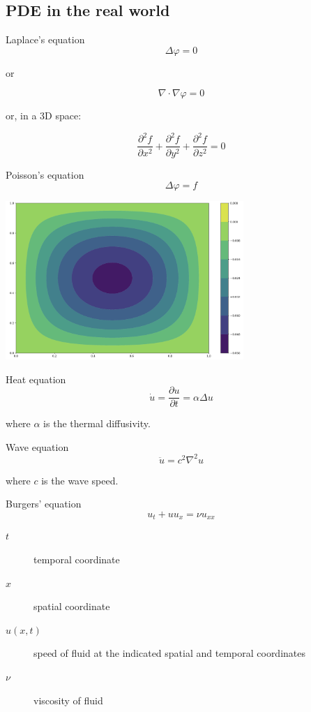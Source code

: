 \documentclass[aspectratio=1610,xcolor={dvipsnames},hyperref={colorlinks,unicode,linkcolor=violet,anchorcolor=BlueViolet,citecolor=YellowOrange,filecolor=black,urlcolor=Aquamarine}]{beamer}
\begin{document}
\subsection{PDE in the real world}
\label{sec:orga8ece5e}

\begin{frame}[label={sec:org391d88d}]{Laplace's equation}
\[\Delta \varphi = 0\]

or

\[\nabla \cdot \nabla \varphi = 0\]

or, in a 3D space:

\[\frac  {\partial ^{2}f}{\partial x^{2}}+\frac  {\partial ^{2}f}{\partial y^{2}}+\frac  {\partial ^{2}f}{\partial z^{2}} = 0\]
\end{frame}

\begin{frame}[label={sec:org4c57d1c}]{Poisson's equation}
\[\Delta \varphi = f\]

\begin{center}
\includegraphics[height=6cm]{./p5.png}
\end{center}
\end{frame}

\begin{frame}[label={sec:orgfe4b3a3}]{Heat equation}
\[\dot{u} = \frac  {\partial u}{\partial t} = \alpha \Delta u\]

where \(\alpha\) is the thermal diffusivity.
\end{frame}

\begin{frame}[label={sec:orgb6db810}]{Wave equation}
\[\ddot {u}=c^{2}\nabla ^{2}u\]

where \(c\) is the wave speed.
\end{frame}

\begin{frame}[label={sec:org21893a0}]{Burgers' equation}
\[u_t + u u_x = \nu u_{xx}\]

\begin{description}
\item[{\(t\)}] temporal coordinate
\item[{\(x\)}] spatial coordinate
\item[{\(u(x, t)\)}] speed of fluid at the indicated spatial and temporal coordinates
\item[{\(\nu\)}] viscosity of fluid
\end{description}
\end{frame}
\end{document}
